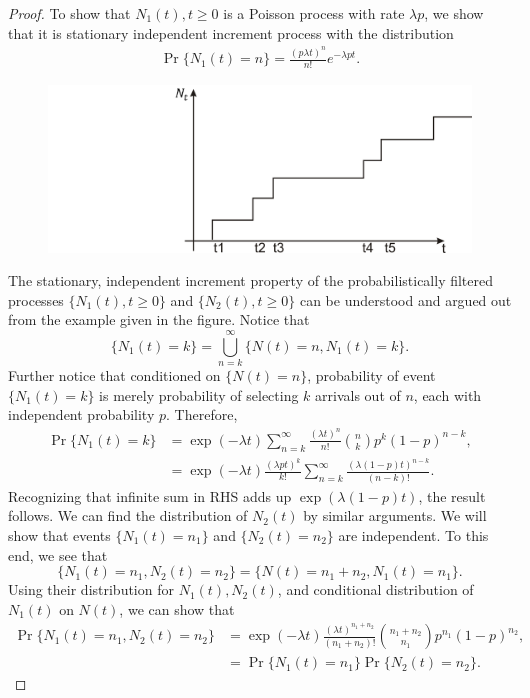\documentclass[a4paper,10pt]{article}
\theoremstyle{plain}
\theoremstyle{definition}
\begin{document}
\begin{proof} To show that ${N_{1}(t), t \geq 0}$ is a Poisson process with rate $\lambda p$, we show that it is stationary independent increment process with the distribution
\begin{eqnarray*}
 \Pr\{N_{1}(t)= n\}  = \frac{(p \lambda t)^{n}}{n!}e^{-\lambda p t}.
\end{eqnarray*}
\begin{figure}
\center
  \includegraphics[width=4.5in]{Figures/distr.PNG}\\
\end{figure}
The stationary, independent increment property of the probabilistically filtered processes $\{N_1(t), t \geqslant 0\}$ and $\{N_2(t), t \geqslant 0\}$ can be understood and argued out from the example given in the figure. Notice that 
\begin{equation*}
	\{N_1(t)=k\} = \bigcup_{n=k}^\infty\{N(t) = n, N_1(t) = k\}.
\end{equation*}
Further notice that conditioned on $\{N(t) = n\}$, probability of event $\{N_1(t) = k\}$ is merely probability of selecting $k$ arrivals out of $n$, each with independent probability $p$. Therefore, 
\begin{align*}
	\Pr\{N_1(t)=k\} &= \exp(-\lambda t)\sum_{n=k}^\infty\frac{(\lambda t)^n}{n!}\binom{n}{k}p^k(1-p)^{n-k},\\
	&= \exp(-\lambda t)\frac{(\lambda p t)^k}{k!}\sum_{n=k}^\infty\frac{(\lambda(1-p)t)^{n-k}}{(n-k)!}.%
\end{align*}
Recognizing that infinite sum in RHS adds up $\exp(\lambda(1-p)t)$, the result follows. We can find the distribution of $N_2(t)$ by similar arguments. We will show that events $\{N_1(t) = n_1\}$ and $\{N_2(t) = n_2\}$ are independent. To this end, we see that 
\begin{equation*}
	\{N_1(t) = n_1, N_2(t) = n_2\} = \{N(t) = n_1 + n_2, N_1(t) = n_1\}.
\end{equation*}
Using their distribution for $N_1(t), N_2(t)$, and conditional distribution of $N_1(t)$ on $N(t)$, we can show that
\begin{align*}
	\Pr\{N_1(t) = n_1, N_2(t) = n_2\} &= \exp(-\lambda t)\frac{(\lambda t)^{n_1 + n_2}}{(n_1 + n_2)!}\binom{n_1 + n_2}{n_1}p^{n_1}(1-p)^{n_2},\\
	&= \Pr\{N_1(t) = n_1\}\Pr\{N_2(t) = n_2\} .
\end{align*}



\end{proof}
\end{document}
